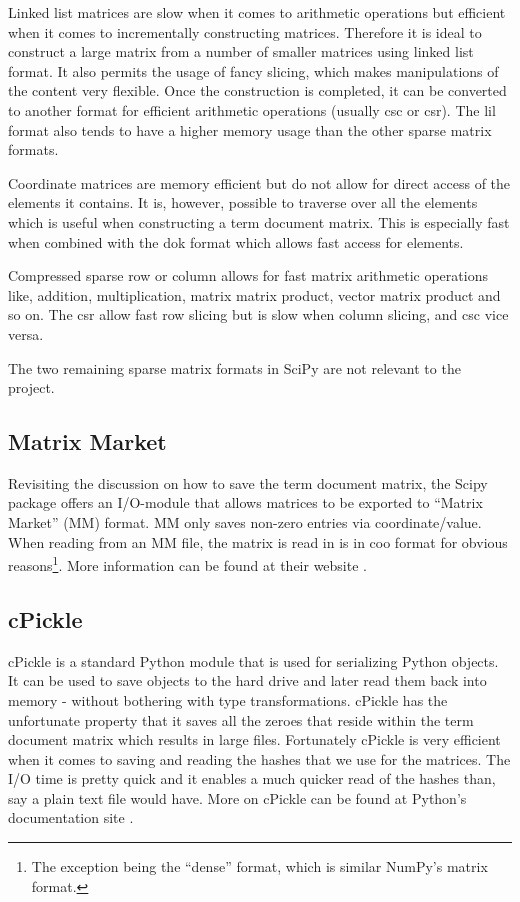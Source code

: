 Linked list matrices are slow when it comes to arithmetic
operations but efficient when it comes to incrementally constructing
matrices. Therefore it is ideal to construct a large matrix from a
number of smaller matrices using linked list format. It also permits
the usage of fancy slicing, which makes manipulations of the content
very flexible. Once the construction is completed, it can be converted to
another format for efficient arithmetic operations (usually csc or
csr). The lil format also tends to have a higher memory usage than the
other sparse matrix formats.

Coordinate matrices are memory efficient but do not allow for
direct access of the elements it contains. It is, however, possible to
traverse over all the elements which is useful when constructing a
term document matrix. This is especially fast when combined with the
dok format which allows fast access for elements.

Compressed sparse row or column allows for fast matrix
arithmetic operations like, addition, multiplication, matrix matrix
product, vector matrix product and so on. The csr allow fast row
slicing but is slow when column slicing, and csc vice versa.

The two remaining sparse matrix formats in SciPy are not relevant to the
project.

\subsection{Matrix Market\label{MatrixMarket}}

Revisiting the discussion on how to save the term document matrix, the
Scipy package \cite{SciPy} offers an I/O-module that allows matrices
to be exported to ``Matrix Market'' (MM) format. MM only saves
non-zero entries via coordinate/value. When reading from an MM
file, the matrix is read in is in coo format for obvious
reasons\footnote{The exception being the ``dense'' format, which is
  similar NumPy's matrix format.}. More information can be found at
their website \cite{MatrixMarket}.

\subsection{cPickle}

cPickle is a standard Python module that is used for serializing
Python objects. It can be used to save objects to the hard drive and
later read them back into memory - without bothering with type
transformations. cPickle has the unfortunate property that it saves
all the zeroes that reside within the term document matrix which
results in large files. Fortunately cPickle is very efficient when it
comes to saving and reading the hashes that we use for the
matrices. The I/O time is pretty quick and it enables a much quicker
read of the hashes than, say a plain text file would have. More on
cPickle can be found at Python's documentation site
\cite{cPicklePython}.

